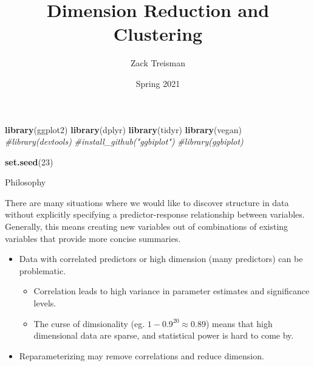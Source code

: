 \documentclass[
  ignorenonframetext,
]{beamer}
\title{Dimension Reduction and Clustering}
\author{Zack Treisman}
\date{Spring 2021}
\newenvironment{Shaded}{\begin{snugshade}}{\end{snugshade}}
\newcommand{\CommentTok}[1]{\textcolor[rgb]{0.56,0.35,0.01}{\textit{#1}}}
\newcommand{\DecValTok}[1]{\textcolor[rgb]{0.00,0.00,0.81}{#1}}
\newcommand{\KeywordTok}[1]{\textcolor[rgb]{0.13,0.29,0.53}{\textbf{#1}}}
\newcommand{\NormalTok}[1]{#1}
\providecommand{\tightlist}{%
  \setlength{\itemsep}{0pt}\setlength{\parskip}{0pt}}
\begin{document}
\frame{\titlepage}

\begin{frame}[fragile]

\scriptsize

\begin{Shaded}
\begin{Highlighting}[]
\KeywordTok{library}\NormalTok{(ggplot2)}
\KeywordTok{library}\NormalTok{(dplyr)}
\KeywordTok{library}\NormalTok{(tidyr)}
\KeywordTok{library}\NormalTok{(vegan)}
\CommentTok{#library(devtools)}
\CommentTok{#install_github("ggbiplot")}
\CommentTok{#library(ggbiplot)}

\KeywordTok{set.seed}\NormalTok{(}\DecValTok{23}\NormalTok{)}
\end{Highlighting}
\end{Shaded}

\end{frame}

\begin{frame}{Philosophy}
\protect\hypertarget{philosophy}{}

There are many situations where we would like to discover structure in
data without explicitly specifying a predictor-response relationship
between variables. Generally, this means creating new variables out of
combinations of existing variables that provide more concise summaries.

\begin{itemize}
\tightlist
\item
  Data with correlated predictors or high dimension (many predictors)
  can be problematic.

  \begin{itemize}
  \tightlist
  \item
    Correlation leads to high variance in parameter estimates and
    significance levels.
  \item
    The curse of dimsionality (eg. \(1-0.9^{20}\approx0.89\)) means that
    high dimensional data are sparse, and statistical power is hard to
    come by.
  \end{itemize}
\item
  Reparameterizing may remove correlations and reduce dimension.
\end{itemize}

\end{frame}
\end{document}
